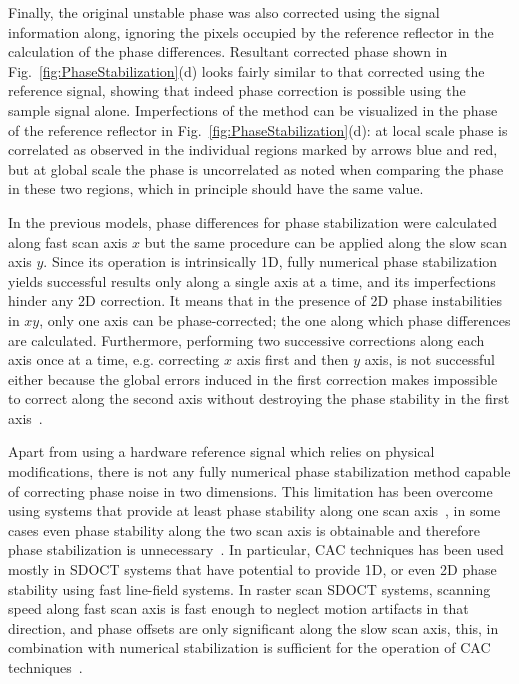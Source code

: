 Finally, the original unstable phase was also corrected using the signal information along, ignoring the pixels occupied by the reference reflector in the calculation of the phase differences. Resultant corrected phase shown in Fig.~\ref{fig:PhaseStabilization}(d) looks fairly similar to that corrected using the reference signal, showing that indeed phase correction is possible using the sample signal alone. Imperfections of the method can be visualized in the phase of the reference reflector in Fig.~\ref{fig:PhaseStabilization}(d): at local scale phase is correlated as observed in the individual regions marked by arrows blue and red, but at global scale the phase is uncorrelated as noted when comparing the phase in these two regions, which in  principle should have the same value.

In the previous models, phase differences for phase stabilization were calculated along fast scan axis $x$ but the same procedure can be applied along the slow scan axis $y$. Since its operation is intrinsically 1D, fully numerical phase stabilization yields successful results only along a single axis at a time, and its imperfections hinder any 2D correction. It means that in the presence of 2D phase instabilities in $xy$, only one axis can be phase-corrected; the one along which phase differences are calculated. Furthermore, performing two successive corrections along each axis once at a time, e.g. correcting $x$ axis first and then $y$ axis, is not successful either because the global errors induced in the first correction makes impossible to correct along the second axis without destroying the phase stability in the first axis~\cite{Ruiz-Lopera2020_Computational}.

Apart from using a hardware reference signal which relies on physical modifications, there is not any fully numerical phase stabilization method capable of correcting phase noise in two dimensions. This limitation has been overcome using systems that provide at least phase stability along one scan axis~\cite{Ginner2017_Noniterative, Shemonski2014_Threedimensional, Fechtig2015_Highspeed, Ginner2018_Holographic, Leitgeb2016_Digital,Yasuno2006_Noniterative, South2019_Local}, in some cases even phase stability along the two scan axis is obtainable and therefore phase stabilization is unnecessary~\cite{Kumar2013_Subaperture, Hillmann2016_Aberrationfree, Pande2016_Automated, Kumar2015_Anisotropic,Sudkamp2018_Simple}. In particular, CAC techniques has been used mostly in SDOCT systems that have potential to provide 1D, or even 2D phase stability using fast line-field systems. In raster scan SDOCT systems, scanning speed along fast scan axis is fast enough to neglect motion artifacts in that direction, and phase offsets are only significant along the slow scan axis, this, in combination with numerical stabilization is sufficient for the operation of CAC techniques~\cite{Shemonski2014_Threedimensional}.

